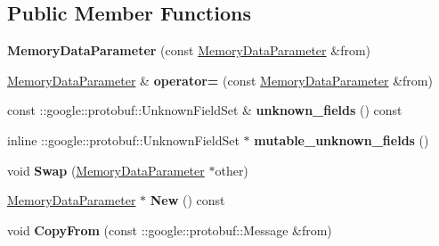 \subsection*{Public Member Functions}
\begin{DoxyCompactItemize}
\item 
\mbox{\label{classcaffe_1_1_memory_data_parameter_ace97655ee354feb6434895713df27c22}} 
{\bfseries Memory\+Data\+Parameter} (const \mbox{\hyperlink{classcaffe_1_1_memory_data_parameter}{Memory\+Data\+Parameter}} \&from)
\item 
\mbox{\label{classcaffe_1_1_memory_data_parameter_ab73fc420f9924fdb5ba36d8e9507eb71}} 
\mbox{\hyperlink{classcaffe_1_1_memory_data_parameter}{Memory\+Data\+Parameter}} \& {\bfseries operator=} (const \mbox{\hyperlink{classcaffe_1_1_memory_data_parameter}{Memory\+Data\+Parameter}} \&from)
\item 
\mbox{\label{classcaffe_1_1_memory_data_parameter_a3bc4d58e8a43c01d25a28bb91d2c89ce}} 
const \+::google\+::protobuf\+::\+Unknown\+Field\+Set \& {\bfseries unknown\+\_\+fields} () const
\item 
\mbox{\label{classcaffe_1_1_memory_data_parameter_ad93fbe909d8506248c5fbe998f4538e3}} 
inline \+::google\+::protobuf\+::\+Unknown\+Field\+Set $\ast$ {\bfseries mutable\+\_\+unknown\+\_\+fields} ()
\item 
\mbox{\label{classcaffe_1_1_memory_data_parameter_a6fb29a205a4e7f144389d4e6ffa4d98d}} 
void {\bfseries Swap} (\mbox{\hyperlink{classcaffe_1_1_memory_data_parameter}{Memory\+Data\+Parameter}} $\ast$other)
\item 
\mbox{\label{classcaffe_1_1_memory_data_parameter_ac1825654d739606c35aeed0da5d670ec}} 
\mbox{\hyperlink{classcaffe_1_1_memory_data_parameter}{Memory\+Data\+Parameter}} $\ast$ {\bfseries New} () const
\item 
\mbox{\label{classcaffe_1_1_memory_data_parameter_a04ea2d77f7368b632ca8a2b3c42c4f57}} 
void {\bfseries Copy\+From} (const \+::google\+::protobuf\+::\+Message \&from)

\end{DoxyCompactItemize}
